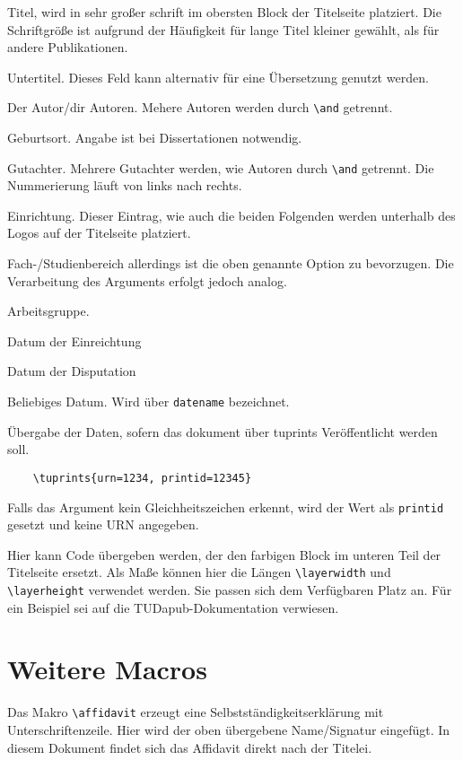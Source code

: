 \documentclass[
	ngerman,
	ruledheaders=chapter,%
	class=book,%
	thesis={
		type=dr,
		dr=rernat
	},
	accentcolor=9c,%
	custommargins=true,%
	marginpar=false,%
	parskip=half-,%
	fontsize=11pt,%
]{tudapub}
\let\code\texttt
\begin{document}
\begin{description}
	\item[title] Titel, wird in sehr großer schrift im obersten Block der Titelseite platziert. Die Schriftgröße ist aufgrund der Häufigkeit für lange Titel kleiner gewählt, als für andere Publikationen.
	\item[subtitle] Untertitel. Dieses Feld kann alternativ für eine Übersetzung genutzt werden.
	\item[author] Der Autor/dir Autoren. Mehere Autoren werden durch \verb+\and+ getrennt.
	\item[birthplace] Geburtsort. Angabe ist bei Dissertationen notwendig.
	\item[reviewer] Gutachter. Mehrere Gutachter werden, wie Autoren durch \verb+\and+ getrennt. Die Nummerierung läuft von links nach rechts.
	\item[institution] Einrichtung. Dieser Eintrag, wie auch die beiden Folgenden werden unterhalb des Logos auf der Titelseite platziert.
	\item[department] Fach-/Studienbereich allerdings ist die oben genannte Option zu bevorzugen. Die Verarbeitung des Arguments erfolgt jedoch analog.
	\item[group] Arbeitsgruppe.
	\item[submissiondate] Datum der Einreichtung
	\item[examdate] Datum der Disputation
	\item[date] Beliebiges Datum. Wird über \verb|datename| bezeichnet.
	\item[tuprints] \label{page:tuprints}Übergabe der Daten, sofern das dokument über tuprints Veröffentlicht werden soll.
	\begin{verbatim}
	\tuprints{urn=1234, printid=12345}
	\end{verbatim}
	Falls das Argument kein Gleichheitszeichen erkennt, wird der Wert als \code{printid} gesetzt und keine URN angegeben. 
	
	\item[titleimage] Hier kann Code übergeben werden, der den farbigen Block im unteren Teil der Titelseite ersetzt. Als Maße können hier die Längen \verb+\layerwidth+ und \verb+\layerheight+ verwendet werden. Sie passen sich dem Verfügbaren Platz an. Für ein Beispiel sei auf die TUDapub-Dokumentation verwiesen.
\end{description}

\section{Weitere Macros}
Das Makro \verb+\affidavit+ erzeugt eine Selbstständigkeitserklärung mit Unterschriftenzeile. Hier wird der oben übergebene Name/Signatur eingefügt.
In diesem Dokument findet sich das Affidavit direkt nach der Titelei.
\end{document}
